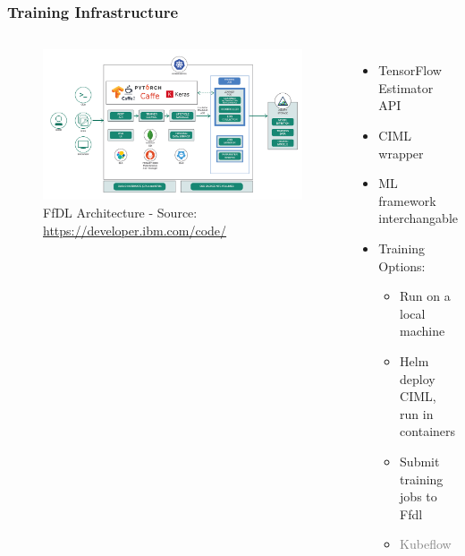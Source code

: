 \documentclass[aspectratio=169,11pt,hyperref={colorlinks=true}]{beamer}
\newcommand{\light}[1]{\textcolor{gray}{#1}}
\begin{document}
\begin{frame}
    \frametitle{Training Infrastructure}
    \begin{columns}
        \begin{figure}
        \begin{center}
          \includegraphics[width=1\textwidth]{diagrams/FfDL-Diagram.png}
             \caption{FfDL Architecture - Source: \href{https://developer.ibm.com/code/2018/03/20/democratize-ai-with-fabric-for-deep-learning/l}{https://developer.ibm.com/code/}}
        \end{center}
        \end{figure}
        \begin{itemize}
          \item{TensorFlow Estimator API}
          \item{CIML wrapper}
          \item{ML framework interchangable}
          \item{Training Options:}
          \begin{itemize}
            \item{Run on a local machine}
            \item{Helm deploy CIML, run in containers}
            \item{Submit training jobs to Ffdl}
            \item{\light{Kubeflow}}
          \end{itemize}
        \end{itemize}
    \end{columns}
\end{frame}
\end{document}

